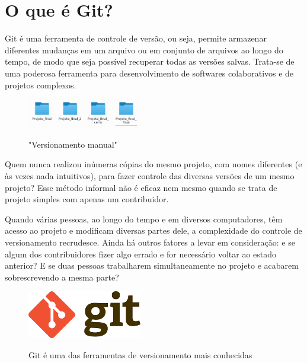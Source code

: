 
\section{O que é Git?}
    Git é uma ferramenta de controle de versão, ou seja, permite armazenar diferentes mudanças em um arquivo ou em conjunto de arquivos ao longo do tempo, de modo que seja possível recuperar todas as versões salvas.
    Trata-se de uma poderosa ferramenta para desenvolvimento de softwares colaborativos e de projetos complexos.
    \begin{figure}[h]
        \caption{"Versionamento manual"}
        \vspace{0.5cm}
        \centering
        \includegraphics[width=5cm]{images/versionamento_errado.png}
        \label{figura:versionamento_errado}
    \end{figure}

    Quem nunca realizou inúmeras cópias do mesmo projeto, com nomes diferentes (e às vezes nada intuitivos), para fazer controle das diversas versões de um mesmo projeto?
    Esse método informal não é eficaz nem mesmo quando se trata de projeto simples com apenas um contribuidor.
    \par Quando várias pessoas, ao longo do tempo e em diversos computadores, têm acesso ao projeto e modificam diversas partes dele, a complexidade do controle de versionamento recrudesce.
    Ainda há outros fatores a levar em consideração: e se algum dos contribuidores fizer algo errado e for necessário voltar ao estado anterior? E se duas pessoas trabalharem simultaneamente no projeto e acabarem sobrescrevendo a mesma parte?
    \begin{figure}[h]
        \caption{Git é uma das ferramentas de versionamento mais conhecidas}
        \vspace{0.5cm}
        \centering
        \includegraphics[width=5cm]{images/git_logo.png}
        \label{figura:git_logo}
    \end{figure}

